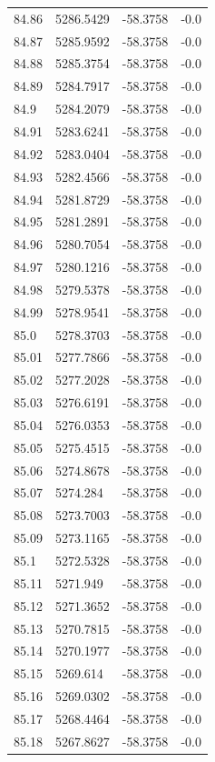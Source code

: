 \begin{table}[H]
\begin{tabular}{llll}
84.86 & 5286.5429 & -58.3758 & -0.0 \\
84.87 & 5285.9592 & -58.3758 & -0.0 \\
84.88 & 5285.3754 & -58.3758 & -0.0 \\
84.89 & 5284.7917 & -58.3758 & -0.0 \\
84.9 & 5284.2079 & -58.3758 & -0.0 \\
84.91 & 5283.6241 & -58.3758 & -0.0 \\
84.92 & 5283.0404 & -58.3758 & -0.0 \\
84.93 & 5282.4566 & -58.3758 & -0.0 \\
84.94 & 5281.8729 & -58.3758 & -0.0 \\
84.95 & 5281.2891 & -58.3758 & -0.0 \\
84.96 & 5280.7054 & -58.3758 & -0.0 \\
84.97 & 5280.1216 & -58.3758 & -0.0 \\
84.98 & 5279.5378 & -58.3758 & -0.0 \\
84.99 & 5278.9541 & -58.3758 & -0.0 \\
85.0 & 5278.3703 & -58.3758 & -0.0 \\
85.01 & 5277.7866 & -58.3758 & -0.0 \\
85.02 & 5277.2028 & -58.3758 & -0.0 \\
85.03 & 5276.6191 & -58.3758 & -0.0 \\
85.04 & 5276.0353 & -58.3758 & -0.0 \\
85.05 & 5275.4515 & -58.3758 & -0.0 \\
85.06 & 5274.8678 & -58.3758 & -0.0 \\
85.07 & 5274.284 & -58.3758 & -0.0 \\
85.08 & 5273.7003 & -58.3758 & -0.0 \\
85.09 & 5273.1165 & -58.3758 & -0.0 \\
85.1 & 5272.5328 & -58.3758 & -0.0 \\
85.11 & 5271.949 & -58.3758 & -0.0 \\
85.12 & 5271.3652 & -58.3758 & -0.0 \\
85.13 & 5270.7815 & -58.3758 & -0.0 \\
85.14 & 5270.1977 & -58.3758 & -0.0 \\
85.15 & 5269.614 & -58.3758 & -0.0 \\
85.16 & 5269.0302 & -58.3758 & -0.0 \\
85.17 & 5268.4464 & -58.3758 & -0.0 \\
85.18 & 5267.8627 & -58.3758 & -0.0 \\

\end{tabular}
\end{table}
